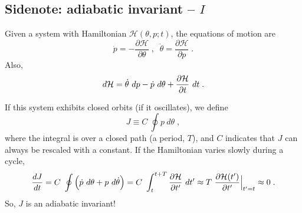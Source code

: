\documentclass[10pt,utf8,compress,xcolor=dvipsnames]{beamer}
\begin{document}
\subsection{Sidenote: adiabatic invariant -- $I$}
\begin{frame}{\insertsubsectionhead}
	Given a system with Hamiltonian $\mathcal{H}(\theta,p;t)$, the equations of motion are 
	\begin{equation*}
	\dot p = - \dfrac{\partial \mathcal{H}}{\partial \theta} \;, \;\; 
	\dot \theta =  \dfrac{\partial \mathcal{H}}{\partial p} \;.
	\end{equation*}
	Also,
	\begin{equation*}
	d \Ham = \dot \theta \ d p - \dot p \ d \theta + \dfrac{\partial \Ham}{\partial t} \ d t \;.  
	\end{equation*}
	
	
	If this system exhibits closed orbits (\eg if it oscillates), we define 
	\begin{equation*}
	J \equiv C \ \oint p \ d \theta \;,
	\end{equation*}
	where the integral is over a closed path (\eg a period, $T$), and $C$ indicates that $J$ can always be rescaled with a constant. If the Hamiltonian varies slowly during a cycle,
	\[
	\dfrac{d J}{d t} = C \ \oint \lrBigb{\dot p \ d \theta + p \ d \dot \theta} = C \ \dint_{t}^{t+T}  \dfrac{\partial \Ham}{\partial t^\prime} \ d t^\prime \approx T \ \dfrac{\partial \Ham(t^{\prime})}{\partial t^{\prime}}\Big|_{t^{\prime}=t} \approx 0 
	\;. 
	\]
	So, $J$ is an adiabatic invariant!
\end{frame}
\end{document}
